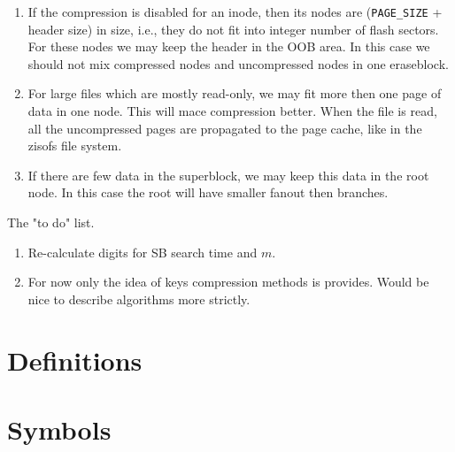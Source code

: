 \documentclass[12pt,a4paper,oneside,titlepage]{article}
\begin{document}
\begin{enumerate}

\item If the compression is disabled for an inode, then its nodes are
(\texttt{PAGE\_SIZE} + header size) in size, i.e., they do not fit into integer
number of flash sectors. For these nodes we may keep the header in the OOB
area. In this case we should not mix compressed nodes and uncompressed nodes in
one eraseblock.

\item For large files which are mostly read-only, we may fit more then one page
of data in one node. This will mace compression better. When the file is read,
all the uncompressed pages are propagated to the page cache, like in the zisofs
file system.

\item If there are few data in the superblock, we may keep this data in the
root node. In this case the root will have smaller fanout then branches.

\end{enumerate}

The "to do" list.

\begin{enumerate}

\item Re-calculate digits for SB search time and $m$.

\item For now only the idea of keys compression methods is provides. Would be
nice to describe algorithms more strictly.

\end{enumerate}

%
%
\section{Definitions}\label{ref_SectDefinitions}



%
%
\section{Symbols} \label{ref_SectionSymbols}
\end{document}
